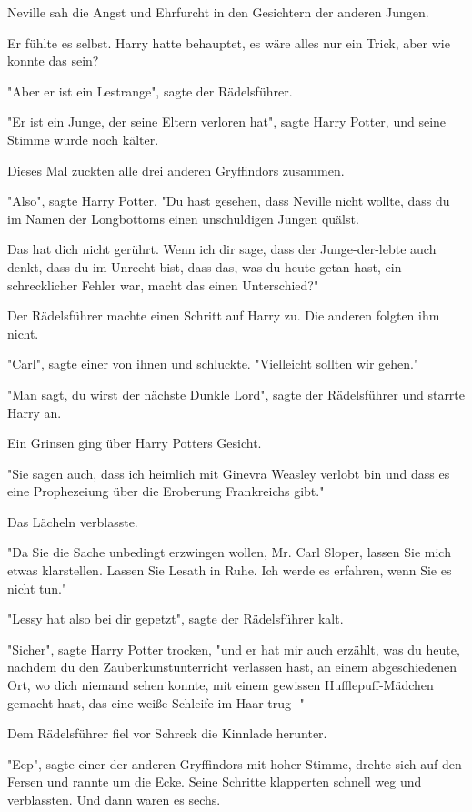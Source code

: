 {Neville sah die Angst und Ehrfurcht in den Gesichtern der anderen Jungen.

Er fühlte es selbst. Harry hatte behauptet, es wäre alles nur ein Trick, aber wie konnte das sein?

"Aber er ist ein Lestrange", sagte der Rädelsführer.

"Er ist ein Junge, der seine Eltern verloren hat", sagte Harry Potter, und seine Stimme wurde noch kälter.

Dieses Mal zuckten alle drei anderen Gryffindors zusammen.

"Also", sagte Harry Potter. "Du hast gesehen, dass Neville nicht wollte, dass du im Namen der Longbottoms einen unschuldigen Jungen quälst.

Das hat dich nicht gerührt. Wenn ich dir sage, dass der Junge-der-lebte auch denkt, dass du im Unrecht bist, dass das, was du heute getan hast, ein schrecklicher Fehler war, macht das einen Unterschied?"

Der Rädelsführer machte einen Schritt auf Harry zu. Die anderen folgten ihm nicht.

"Carl", sagte einer von ihnen und schluckte. "Vielleicht sollten wir gehen."

"Man sagt, du wirst der nächste Dunkle Lord", sagte der Rädelsführer und starrte Harry an.

Ein Grinsen ging über Harry Potters Gesicht.

"Sie sagen auch, dass ich heimlich mit Ginevra Weasley verlobt bin und dass es eine Prophezeiung über die Eroberung Frankreichs gibt."

Das Lächeln verblasste.

"Da Sie die Sache unbedingt erzwingen wollen, Mr. Carl Sloper, lassen Sie mich etwas klarstellen. Lassen Sie Lesath in Ruhe. Ich werde es erfahren, wenn Sie es nicht tun."

"Lessy hat also bei dir gepetzt", sagte der Rädelsführer kalt.

"Sicher", sagte Harry Potter trocken, "und er hat mir auch erzählt, was du heute, nachdem du den Zauberkunstunterricht verlassen hast, an einem abgeschiedenen Ort, wo dich niemand sehen konnte, mit einem gewissen Hufflepuff-Mädchen gemacht hast, das eine weiße Schleife im Haar trug -"

Dem Rädelsführer fiel vor Schreck die Kinnlade herunter.

"Eep", sagte einer der anderen Gryffindors mit hoher Stimme, drehte sich auf den Fersen und rannte um die Ecke. Seine Schritte klapperten schnell weg und verblassten. Und dann waren es sechs.

}

